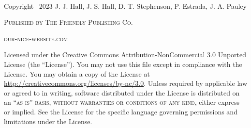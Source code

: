 \documentclass[11pt,fleqn]{book} %
\newcommand*{\steezybreak}{\vspace{0.35cm}}
\begin{document}

\begingroup
\thispagestyle{empty} %
\vfill
\endgroup


\newpage
~\vfill
\thispagestyle{empty}

\noindent Copyright \textcopyright  \ 2023 J. J. Hall, J. S. Hall, D. T. Stephenson, P. Estrada, J. A. Pauley \steezybreak%

\noindent \textsc{Published by The Friendly Publishing Co.}\steezybreak %

\noindent \textsc{our-nice-website.com}\steezybreak %

\noindent Licensed under the Creative Commons Attribution-NonCommercial 3.0 Unported License (the ``License''). You may not use this file except in compliance with the License. You may obtain a copy of the License at \url{http://creativecommons.org/licenses/by-nc/3.0}. Unless required by applicable law or agreed to in writing, software distributed under the License is distributed on an \textsc{``as is'' basis, without warranties or conditions of any kind}, either express or implied. See the License for the specific language governing permissions and limitations under the License.\steezybreak %
\end{document}
